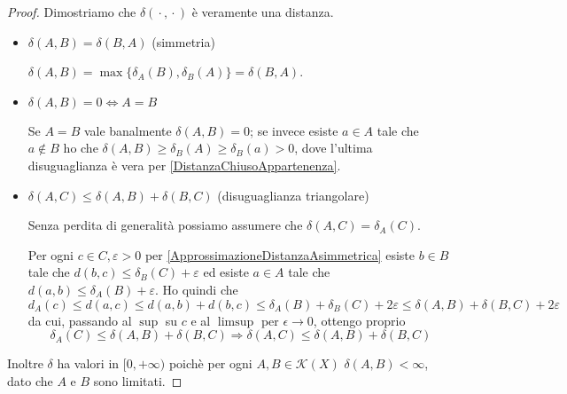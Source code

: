 \begin{proof}
	Dimostriamo che $\delta({}\cdot{},{}\cdot{})$ è veramente una distanza.
	\begin{itemize}
		\item $\delta(A,B)=\delta(B,A)$ (simmetria)
		
		$\delta(A,B)=\max\{ \delta_A(B),\delta_B(A) \}=\delta(B,A)$.
		\item $\delta(A,B)=0 \iff A=B$
		
		Se $A=B$ vale banalmente $\delta(A,B)=0$; se invece esiste $a\in A$ tale che $a\not\in B$ ho che $\delta(A,B)\ge \delta_B(A)\ge \delta_B(a)>0$, dove l'ultima disuguaglianza è vera per \cref{DistanzaChiusoAppartenenza}.
		\item $\delta(A,C)\le \delta(A,B)+\delta(B,C)$ (disuguaglianza triangolare)

		Senza perdita di generalità possiamo assumere che $\delta(A,C)=\delta_A(C)$. 

		Per ogni $c\in C,\varepsilon>0$ per \cref{ApprossimazioneDistanzaAsimmetrica} esiste $b\in B$ tale che $d(b,c)\le \delta_B(C)+\varepsilon$ ed esiste $a\in A$ tale che $d(a,b)\le \delta_A(B)+\varepsilon$. Ho quindi che
		\begin{equation*}
			d_A(c)\le d(a,c)\le d(a,b)+d(b,c)\le \delta_A(B)+\delta_B(C)+2\varepsilon\le \delta(A,B)+\delta(B,C)+2\varepsilon
		\end{equation*}
		da cui, passando al $\sup$ su $c$ e al $\limsup$ per $\epsilon\to 0$, ottengo proprio
		\begin{equation*}
			\delta_A(C)\le \delta(A,B)+\delta(B,C) \Longrightarrow \delta(A,C)\le \delta(A,B)+\delta(B,C)
		\end{equation*}


		
% 		
%  		
	\end{itemize}
	Inoltre $\delta$ ha valori in $[0,+\infty)$ poichè per ogni $A,B\in \mathcal{K}(X)$ $\delta(A,B)<\infty$, dato che $A$ e $B$ sono limitati.
\end{proof}

